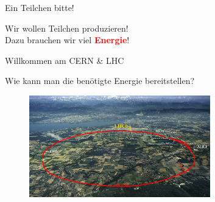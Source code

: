 \begin{frame}{Ein Teilchen bitte!}

    \begin{center}
   \Large Wir wollen Teilchen produzieren!\\
    
    \Large Dazu brauchen wir viel \textbf{\textcolor{red}{Energie}}!
        
    \end{center}
    
\end{frame}

\begin{frame}{Willkommen am CERN \& LHC}

  \begin{center}
   \Large Wie kann man die benötigte Energie bereitstellen?
    \end{center}
    
    \begin{figure}[h]
        \centering
        \includegraphics[width=0.7\textwidth]{Figures Introductory Lecture/LHCb Detector/LHC.jpg} %
        \label{fig:CERN_LHC}
    \end{figure}
\end{frame}

